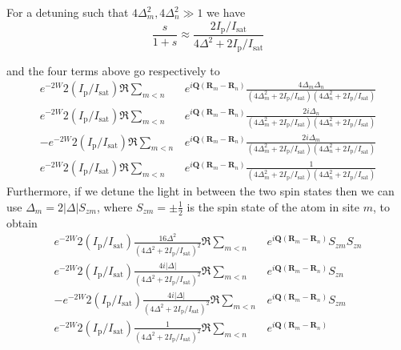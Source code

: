 \documentclass[11pt,letter]{article}
\newcommand{\bv}[1]{\ensuremath{\bm{#1}}}
\newcommand{\iisat}{\ensuremath{I_{\mathrm{p}}/I_{\mathrm{sat}}}}
\begin{document}
For a detuning such that $4\Delta_{m}^{2}, 4\Delta_{n}^{2} \gg 1 $ we have
\begin{equation}
  \frac{s}{1+s} \approx \frac{2 \iisat }
                             { 4 \Delta^{2} + 2 \iisat }
\end{equation}



and the four terms above go respectively to  
\begin{align} 
     e^{-2W} 2(\iisat)\Re \sum_{m<n} & 
      e^{ i \bv{Q}( \bv{R}_{m} - \bv{R}_{n} ) } 
      \frac{ 4 \Delta_{m} \Delta_{n} } 
           {(4 \Delta_{m}^{2} + 2 \iisat)(4 \Delta_{n}^{2} + 2 \iisat)
 }  \\
     e^{-2W} 2(\iisat)\Re \sum_{m<n} & 
      e^{ i \bv{Q}( \bv{R}_{m} - \bv{R}_{n} ) } 
      \frac{ 2 i \Delta_{n} } 
           {(4 \Delta_{m}^{2} + 2 \iisat)(4 \Delta_{n}^{2} + 2 \iisat)
 }   \\
    -e^{-2W} 2(\iisat) \Re \sum_{m<n} & 
      e^{ i \bv{Q}( \bv{R}_{m} - \bv{R}_{n} ) } 
      \frac{ 2 i \Delta_{m} } 
           {(4 \Delta_{m}^{2} + 2 \iisat)(4 \Delta_{n}^{2} + 2 \iisat)
 }   \\
     e^{-2W} 2(\iisat)\Re \sum_{m<n} & 
      e^{ i \bv{Q}( \bv{R}_{m} - \bv{R}_{n} ) } 
      \frac{ 1} { (4 \Delta_{m}^{2} + 2 \iisat)(4 \Delta_{n}^{2} + 2 \iisat)
}   
\end{align}
Furthermore, if we detune the light in between the two spin states then we can
use $\Delta_{m} = 2|\Delta|S_{zm}$, where $S_{zm}=\pm\frac{1}{2}$ is
the spin state of the atom in site $m$, to obtain
\begin{align} 
     e^{-2W} 2(\iisat)
      \frac{ 16 \Delta^{2}  } 
           {(4 \Delta^{2} + 2 \iisat)^{2} }  
       \Re \sum_{m<n} & 
      e^{ i \bv{Q}( \bv{R}_{m} - \bv{R}_{n} ) } 
      S_{zm}S_{zn}\\
     e^{-2W} 2(\iisat)
      \frac{ 4 i |\Delta| } 
           {(4 \Delta^{2} + 2 \iisat)^{2} }  
      \Re \sum_{m<n} & 
      e^{ i \bv{Q}( \bv{R}_{m} - \bv{R}_{n} ) } 
      S_{zn}  \\
    -e^{-2W} 2(\iisat) 
      \frac{ 4 i |\Delta|} 
           {(4 \Delta^{2} + 2 \iisat)^{2} }  
      \Re \sum_{m<n} & 
      e^{ i \bv{Q}( \bv{R}_{m} - \bv{R}_{n} ) } 
        S_{zm} \\
     e^{-2W} 2(\iisat)
      \frac{ 1} { (4 \Delta^{2} + 2 \iisat)^{2} }   
       \Re \sum_{m<n} & 
      e^{ i \bv{Q}( \bv{R}_{m} - \bv{R}_{n} ) } 
\end{align}
\end{document}
